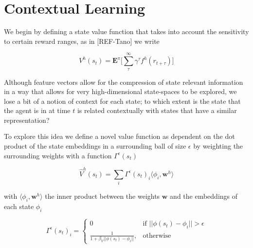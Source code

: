 \documentclass{article}
\begin{document}


\newpage
\section{Contextual Learning}

We begin by defining a state value function that takes into account the sensitivity to certain 
reward ranges, as in [REF-Tano] we write 

\begin{equation}
  V^h(s_t) = \mathbf{E}^\pi \big[  \sum_\tau^\infty \gamma^\tau f^h(r_{t+\tau}) \big ]
\end{equation}

Although feature vectors allow for the compression of state relevant information in a way that 
allows for very high-dimensional state-spaces to be explored, we lose a bit of a notion of context
for each state; to which extent is the state that the agent is in at time $t$ is related contextually 
with states that have a similar representation? 

To explore this idea we define a novel value function as dependent on the dot product of the state embeddings in 
a surrounding ball of size $\epsilon$ by weighting the surrounding weights with a function $\Gamma^\epsilon(s_t)$


\begin{equation}
  \hat{V}^h(s_t) = \sum_{i} \Gamma^\epsilon(s_t)_i \langle\phi_i,\mathbf{w}^h\rangle
\end{equation}

with $\langle\phi_i,\mathbf{w}^h\rangle$ the inner product between the weights $\mathbf{w}$ and the embeddings of each state $\phi_i$

\begin{equation}
\Gamma^\epsilon(s_t)_i = 
\begin{cases}
    0 & \text{if } ||\phi(s_t)-\phi_i||>\epsilon\\
     \frac{1}{1+\beta_V ||\phi(s_t)-\phi_i||},         & \text{otherwise}
\end{cases}
\end{equation}
\end{document}

